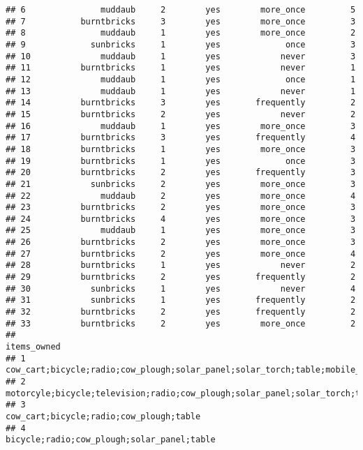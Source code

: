 \documentclass[
]{article}
\begin{document}
\begin{verbatim}
## 6               muddaub     2        yes        more_once         5
## 7           burntbricks     3        yes        more_once         3
## 8               muddaub     1        yes        more_once         2
## 9             sunbricks     1        yes             once         3
## 10              muddaub     1        yes            never         3
## 11          burntbricks     1        yes            never         1
## 12              muddaub     1        yes             once         1
## 13              muddaub     1        yes            never         1
## 14          burntbricks     3        yes       frequently         2
## 15          burntbricks     2        yes            never         2
## 16              muddaub     1        yes        more_once         3
## 17          burntbricks     3        yes       frequently         4
## 18          burntbricks     1        yes        more_once         3
## 19          burntbricks     1        yes             once         3
## 20          burntbricks     2        yes       frequently         3
## 21            sunbricks     2        yes        more_once         3
## 22              muddaub     2        yes        more_once         4
## 23          burntbricks     2        yes        more_once         3
## 24          burntbricks     4        yes        more_once         3
## 25              muddaub     1        yes        more_once         3
## 26          burntbricks     2        yes        more_once         3
## 27          burntbricks     2        yes        more_once         4
## 28          burntbricks     1        yes            never         2
## 29          burntbricks     2        yes       frequently         2
## 30            sunbricks     1        yes            never         4
## 31            sunbricks     1        yes       frequently         2
## 32          burntbricks     2        yes       frequently         2
## 33          burntbricks     2        yes        more_once         2
##                                                                                                              items_owned
## 1                                           cow_cart;bicycle;radio;cow_plough;solar_panel;solar_torch;table;mobile_phone
## 2                                     motorcyle;bicycle;television;radio;cow_plough;solar_panel;solar_torch;table;fridge
## 3                                                                                cow_cart;bicycle;radio;cow_plough;table
## 4                                                                             bicycle;radio;cow_plough;solar_panel;table

\end{verbatim}
\end{document}
